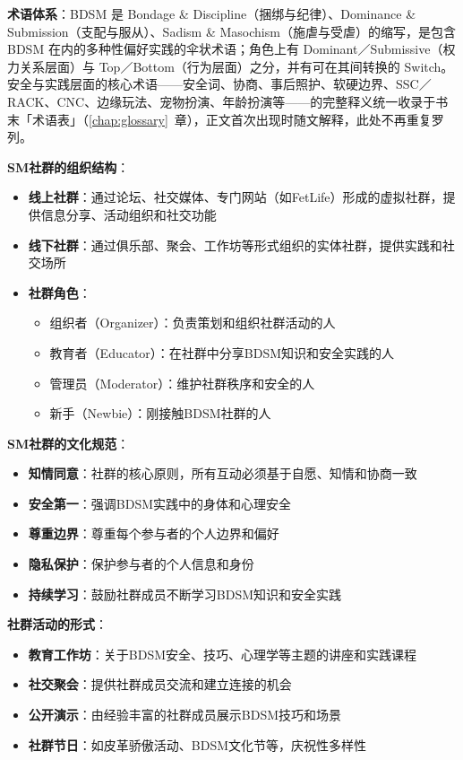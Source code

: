 \documentclass[12pt,UTF8]{ctexbook}
\begin{document}
\textbf{术语体系}：BDSM 是 Bondage \& Discipline（捆绑与纪律）、Dominance \& Submission（支配与服从）、Sadism \& Masochism（施虐与受虐）的缩写，是包含 BDSM 在内的多种性偏好实践的伞状术语；角色上有 Dominant／Submissive（权力关系层面）与 Top／Bottom（行为层面）之分，并有可在其间转换的 Switch。安全与实践层面的核心术语——安全词、协商、事后照护、软硬边界、SSC／RACK、CNC、边缘玩法、宠物扮演、年龄扮演等——的完整释义统一收录于书末「术语表」（\ref{chap:glossary}~章），正文首次出现时随文解释，此处不再重复罗列。

\textbf{SM社群的组织结构}：
  \begin{itemize}
  \item \textbf{线上社群}：通过论坛、社交媒体、专门网站（如FetLife）形成的虚拟社群，提供信息分享、活动组织和社交功能
  \item \textbf{线下社群}：通过俱乐部、聚会、工作坊等形式组织的实体社群，提供实践和社交场所
  \item \textbf{社群角色}：
    \begin{itemize}
    \item 组织者（Organizer）：负责策划和组织社群活动的人
    \item 教育者（Educator）：在社群中分享BDSM知识和安全实践的人
    \item 管理员（Moderator）：维护社群秩序和安全的人
    \item 新手（Newbie）：刚接触BDSM社群的人
    \end{itemize}
  \end{itemize}

\textbf{SM社群的文化规范}：
  \begin{itemize}
  \item \textbf{知情同意}：社群的核心原则，所有互动必须基于自愿、知情和协商一致
  \item \textbf{安全第一}：强调BDSM实践中的身体和心理安全
  \item \textbf{尊重边界}：尊重每个参与者的个人边界和偏好
  \item \textbf{隐私保护}：保护参与者的个人信息和身份
  \item \textbf{持续学习}：鼓励社群成员不断学习BDSM知识和安全实践
  \end{itemize}

\textbf{社群活动的形式}：
  \begin{itemize}
  \item \textbf{教育工作坊}：关于BDSM安全、技巧、心理学等主题的讲座和实践课程
  \item \textbf{社交聚会}：提供社群成员交流和建立连接的机会
  \item \textbf{公开演示}：由经验丰富的社群成员展示BDSM技巧和场景
  \item \textbf{社群节日}：如皮革骄傲活动、BDSM文化节等，庆祝性多样性
  \end{itemize}
\end{document}
